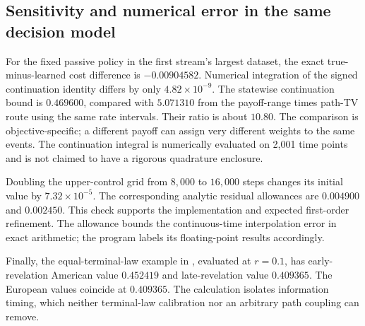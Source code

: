 \subsection{Sensitivity and numerical error in the same decision model}
For the fixed passive policy in the first stream's largest dataset, the exact true-minus-learned cost difference is $-0.00904582$. Numerical integration of the signed continuation identity differs by only $4.82\times10^{-9}$. The statewise continuation bound is $0.469600$, compared with $5.071310$ from the payoff-range times path-TV route using the same rate intervals. Their ratio is about $10.80$. The comparison is objective-specific; a different payoff can assign very different weights to the same events. The continuation integral is numerically evaluated on 2,001 time points and is not claimed to have a rigorous quadrature enclosure.

Doubling the upper-control grid from $8{,}000$ to $16{,}000$ steps changes its initial value by $7.32\times10^{-5}$. The corresponding analytic residual allowances are $0.004900$ and $0.002450$. This check supports the implementation and expected first-order refinement. The allowance bounds the continuous-time interpolation error in exact arithmetic; the program labels its floating-point results accordingly.

Finally, the equal-terminal-law example in , evaluated at $r=0.1$, has early-revelation American value $0.452419$ and late-revelation value $0.409365$. The European values coincide at $0.409365$. The calculation isolates information timing, which neither terminal-law calibration nor an arbitrary path coupling can remove.
